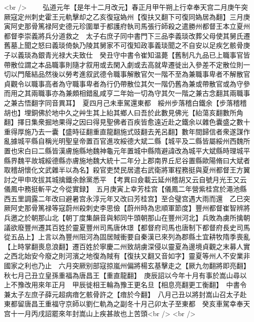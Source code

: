 <br />
　　弘道元年【是年十二月改元】春正月甲午朔上行幸奉天宫二月庚午突厥寇定州刺史霍王元軌擊却之乙亥復寇媯州【復扶又翻下可復同媯居為翻】三月庚寅阿史那骨篤禄阿史德元珍圍單于都護府執司馬張行師殺之遣勝州都督王本立夏州都督李崇義將兵分道救之　太子右庶子同中書門下三品李義琰改葬父母使其舅氏遷舊墓上聞之怒曰義琰倚埶乃陵其舅家不可復知政事義琰聞之不自安以足疾乞骸骨庚子以義琰為銀青光禄大夫致仕　癸丑守中書令崔知温薨【舊制凡九品已上職事官皆帶散位謂之本品職事則隨才叙用或去閑入劇或去高就卑遷徙出入參差不定散位則一切以門䕃結品然後以勞考進叙武德令職事解散官欠一階不至為兼職事卑者不解散官貞觀令以職事高者為守職事卑者為行仍帶散位其欠一階仍舊為兼或帶散官或為守參而用之其兩職事亦為兼頗相錯亂咸亨二年始一切為守其欠一階之兼古念翻其兩職事之兼古悟翻字同音異耳】　夏四月己未車駕還東都　綏州步落稽白鐵余【步落稽稽胡也】埋銅佛於地中久之艸生其上紿其鄉人曰吾於此數見佛光【紿蕩亥翻數所角翻】擇日集衆掘地果得之因曰得見聖佛者百疾皆愈遠近赴之鐵余以雜色囊盛之數十重得厚施乃去一囊【盛時征翻重直龍翻施式豉翻去羌呂翻】數年間歸信者衆遂謀作亂據城平縣自稱光明聖皇帝置百官進攻綏德大斌二縣【城平及二縣皆屬綏州西魏所置也宋白曰二縣皆漢膚施縣地魏神龜元年置城中縣隋避諱改為城平大斌縣時理城平縣界魏平故城綏德縣亦膚施地魏大統十二年分上郡南界丘尼谷置縣歐陽脩曰大斌者取稽胡懷化文武雜半以為名】殺官吏焚民居遣右武衛將軍程務挺與夏州都督王方翼討之甲申攻拔其城擒鐵余餘黨悉平　【考異曰僉載云延州稽胡又云自號月光王又云儀鳳中務挺斬平之今從實録】　五月庚寅上幸芳桂宫【儀鳳二年營紫桂宫於澠池縣西五里調露二年改曰避暑宫永淳元年又改曰芳桂宫】至合璧宫遇大雨而還　乙巳突厥阿史那骨篤禄等寇蔚州殺刺史李思儉【蔚州時為忠順軍節度】豐州都督崔智辨將兵邀之於朝那山北【朝丁度集韻音與邾同牛頭朝那山在豐州河北】兵敗為虜所擒朝議欲廢豐州遷其百姓於靈夏豐州司馬唐休璟【都督府司馬也唐制下都督府長史司馬從五品上】上言以為豐州阻河為固居賊衝要自秦漢已來列為郡縣土宜耕牧隋季喪亂【上時掌翻喪息浪翻】遷百姓於寧慶二州致胡虜深侵以靈夏為邊境貞觀之末募人實之西北始安今廢之則河濱之地復為賊有【復扶又翻又音如字】靈夏等州人不安業非國家之利也乃止　六月突厥别部寇掠嵐州偏將楊玄基擊走之【厥九勿翻將即亮翻】　秋七月己丑立皇孫重福為唐昌王【重直龍翻】　庚辰詔以今年十月有事於嵩山尋以上不豫改用來年正月　甲辰徙相王輪為豫王更名旦【相息亮翻更工衡翻】　中書令兼太子左庶子薛元超病瘖乞骸骨許之【瘖於今翻】　八月己丑以將封嵩山召太子赴東都留唐昌王重福守京師以劉仁軌為之副冬十月己卯太子至東都　癸亥車駕幸奉天宫十一月丙戌詔罷來年封嵩山上疾甚故也上苦頭<br />
<br />
